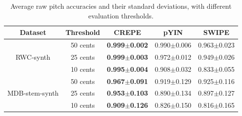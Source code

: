\begin{table}[t]
	\begin{center}
		\setlength{\tabcolsep}{0.4em}
		\renewcommand{\arraystretch}{1.3}
		\begin{tabular}{c|c||c|c|c} \hline
			\multicolumn{1}{c}{Dataset} & \multicolumn{1}{c}{Threshold} &  \multicolumn{1}{c}{CREPE} & \multicolumn{1}{c}{pYIN} & \multicolumn{1}{c}{SWIPE} \\ \hline
			
			\multirow{3}{*}{\parbox[c]{1cm}{\centering RWC-synth}} 
			& 50 cents & \textbf{0.999$\pm$0.002} & 0.990$\pm$0.006 & 0.963$\pm$0.023 \\ \cline{2-5}
			& 25 cents & \textbf{0.999$\pm$0.003} & 0.972$\pm$0.012 & 0.949$\pm$0.026 \\ \cline{2-5}
			& 10 cents & \textbf{0.995$\pm$0.004} & 0.908$\pm$0.032 & 0.833$\pm$0.055 \\ \hline \hline
			
			\multirow{3}{*}{\parbox[c]{1cm}{\centering MDB-stem-synth}} 
			& 50 cents & \textbf{0.967$\pm$0.091} & 0.919$\pm$0.129 & 0.925$\pm$0.116 \\ \cline{2-5}
			& 25 cents & \textbf{0.953$\pm$0.103} & 0.890$\pm$0.134 & 0.897$\pm$0.127 \\ \cline{2-5}
			& 10 cents & \textbf{0.909$\pm$0.126} & 0.826$\pm$0.150 & 0.816$\pm$0.165 \\ \hline
		\end{tabular}
	\end{center}
	\caption{Average raw pitch accuracies and their standard deviations, with different evaluation thresholds.}
	\label{tbl:thresholds}
\end{table}

